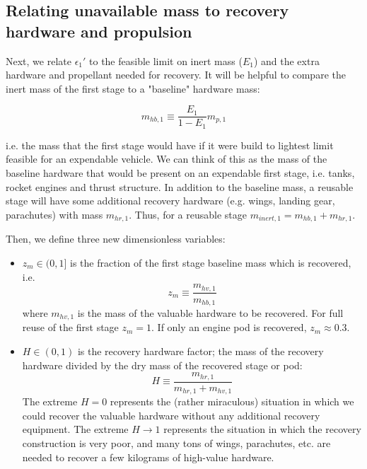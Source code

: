\documentclass[conf]{new-aiaa}
\begin{document}
\begin{multicols}{2}
\subsection{Relating unavailable mass to recovery hardware and propulsion}
Next, we relate $\epsilon_1'$ to the feasible limit on inert mass ($E_1$) and the extra hardware and propellant needed for recovery.
It will be helpful to compare the inert mass of the first stage to a "baseline" hardware mass:

\begin{equation}
m_{hb,1} \equiv \frac{E_1}{1 - E_1} m_{p,1}
\end{equation}

i.e. the mass that the first stage would have if it were build to lightest limit feasible for an expendable vehicle. We can think of this as the mass of the baseline hardware that would be present on an expendable first stage, i.e. tanks, rocket engines and thrust structure. In addition to the baseline mass, a reusable stage will have some additional recovery hardware (e.g. wings, landing gear, parachutes) with mass $m_{hr,1}$. Thus, for a reusable stage $m_{inert,1} = m_{hb,1} + m_{hr,1}$.

Then, we define three new dimensionless variables:
\begin{itemize}
    \item $z_m \in (0, 1]$ is the fraction of the first stage baseline mass which is recovered, i.e.
    \begin{equation}
    z_m \equiv \frac{m_{hv,1}}{m_{hb,1}}
    \end{equation}
    where $m_{hv,1}$ is the mass of the valuable hardware to be recovered. For full reuse of the first stage $z_m = 1$. If only an engine pod is recovered, $z_m \approx 0.3$.

    \item $H \in (0, 1)$ is the recovery hardware factor; the mass of the recovery hardware divided by the dry mass of the recovered stage or pod:
    \begin{equation}
    H \equiv \frac{m_{hr,1}}{m_{hr,1} + m_{hv,1}}
    \end{equation}
    The extreme $H=0$ represents the (rather miraculous) situation in which we could recover the valuable hardware without any additional recovery equipment. The extreme $H \rightarrow 1$ represents the situation in which the recovery construction is very poor, and many tons of wings, parachutes, etc. are needed to recover a few kilograms of high-value hardware.


\end{itemize}
\end{multicols}
\end{document}
